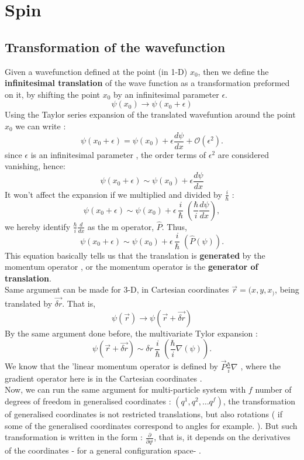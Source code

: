 \chapter{Spin}
\section{Transformation of the wavefunction}
Given a wavefunction defined at the point (in 1-D) $ x_0$, then we define the  \textbf{infinitesimal translation } of the wave function as a transformation preformed on it, by shifting the point $x_0$ by an infinitesimal parameter $ \epsilon$.
\[
\psi(x_0)\longrightarrow \psi(x_0+ \epsilon)
\] 
Using the Taylor series expansion of the translated wavefuntion  around the point $x_0$ we can write :
\begin{equation}
\psi(x_0+\epsilon) = \psi(x_0)+ \epsilon \frac{d \psi}{dx} + \mathcal{O} ( \epsilon^2).
\end{equation}
since $ \epsilon$ is an infinitesimal parameter , the order terms of $\epsilon^2$ are considered vanishing, hence:
\begin{equation}
\psi(x_0+\epsilon) \sim \psi(x_0)+ \epsilon \frac{d \psi}{dx}
\end{equation}
It won't affect the expansion if we multiplied and divided by $ \frac{i}{\hbar}$ :
\begin{equation}
\psi(x_0+\epsilon) \sim \psi(x_0)+ \epsilon\, \frac{i}{\hbar}\; \left( \frac{\hbar}{i} \frac{d \psi}{dx} \right) ,
\end{equation}
we hereby identify $ \frac{\hbar}{i} \frac{d }{dx} $ as the m operator, $ \hat P$. Thus,
\begin{equation}
\psi(x_0+\epsilon) \sim \psi(x_0)+ \epsilon\, \frac{i}{\hbar}\; \left(\hat P ( \psi) \right) .
\end{equation}
This equation basically tells us that the translation is \textbf{generated} by the momentum operator , or the momentum operator is the\textbf{ generator of translation}. \\
Same argument can be made for 3-D, in Cartesian coordinates $ \vec r = (x,y,x_)$, being translated by $\vec{\delta r}$. That is,
\[
\psi ( \vec r) \longrightarrow \psi ( \vec r + \vec{\delta r})
\]
By the same argument done before, the multivariate Tylor expansion :
\begin{equation}
\psi ( \vec r + \vec{\delta r})
\sim \delta r \, \frac{i}{\hbar}\; \left( \frac{\hbar}{i} \nabla ( \psi) \right) .
\end{equation}
We know that the 'linear momentum operator is defined by $ \vec P \frac{\hbar}{i} \nabla$ , where the gradient operator here is in the Cartesian coordinates .\\
Now, we can run the same argument for multi-particle system  with $f $ number of degrees of freedom in generalised coordinates : $ ( q^1,q^2, \dots q^f)$, the transformation of generalised coordinates is not restricted  translations, but also rotations ( if some of the generalised coordinates correspond to angles for example. ). But such transformation is written in the form  : $ \frac{ \partial }{ \partial q^i}$, that is, it depends on the derivatives of the coordinates - for a general configuration space- . \\
